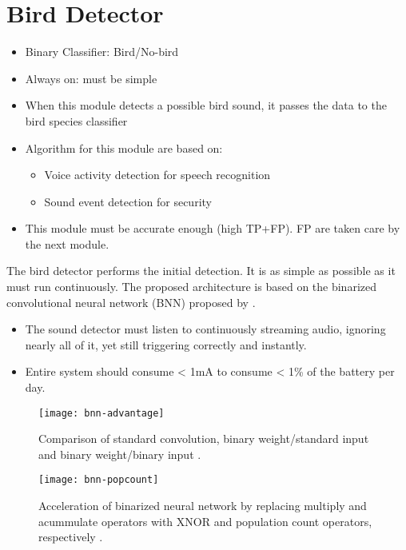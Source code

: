 \section{Bird Detector}


\begin{itemize}
	\item Binary Classifier: Bird/No-bird
	\item Always on: must be simple
	\item When this module detects a possible bird sound, 
			it passes the data to the bird species classifier
	\item Algorithm for this module are based on:
	\begin{itemize}
		\item Voice activity detection for speech recognition
		\item Sound event detection for security
	\end{itemize}
	\item This module must be accurate enough (high TP+FP). FP are taken care by the next module.
\end{itemize}


The bird detector performs the initial detection.
It is as simple as possible as it must run continuously.
The proposed architecture is based on the binarized convolutional neural network (BNN) proposed by \cite{Courbariaux2016}.

	\begin{itemize}
		\item
		The sound detector must listen to continuously streaming audio, ignoring nearly all of it, yet still triggering correctly and instantly.
		\item
		Entire system should consume < 1mA to consume < 1\% of the battery per day. \citep{Gruenstein2017}
	\end{itemize}

\begin{figure}
    \centering
    \texttt{[image: bnn-advantage]}
    \caption{Comparison of standard convolution, binary weight/standard input and binary weight/binary input \citep{Rastegari2016}.}
    \label{bnn-advantage}
\end{figure}

\begin{figure}
    \centering
    \texttt{[image: bnn-popcount]}
    \caption{Acceleration of binarized neural network by replacing multiply and acummulate operators with XNOR and population count operators, respectively \citep{Rastegari2016}.}
    \label{bnn-popcount}
\end{figure}



